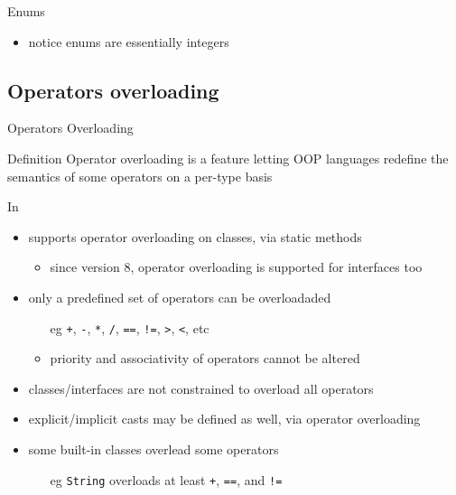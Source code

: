 \documentclass[presentation]{beamer}
\begin{document}
\begin{frame}[allowframebreaks]{Enums}
  \begin{itemize}
    \item notice enums are essentially integers
  \end{itemize}
\end{frame}

\subsection{Operators overloading}

\begin{frame}[allowframebreaks]{Operators Overloading}
  \begin{exampleblock}{Definition}\centering
    Operator overloading is a feature letting OOP languages redefine the semantics of some operators on a per-type basis
  \end{exampleblock}

  \begin{block}{In \dotnet}
    \begin{itemize}
      \item \dotnet supports operator overloading on classes, via static methods
      \begin{itemize}
        \item since version 8, operator overloading is supported for interfaces too
      \end{itemize}

      \item only a predefined set of operators can be overloadaded
      \begin{itemize}
        \item[eg] \texttt{+}, \texttt{-}, \texttt{*}, \texttt{/}, \texttt{==}, \texttt{!=}, \texttt{>}, \texttt{<}, etc
        \item priority and associativity of operators cannot be altered
      \end{itemize}

      \item classes/interfaces are not constrained to overload all operators
      
      \item explicit/implicit casts may be defined as well, via operator overloading
      
      \item some built-in classes overlead some operators
      \begin{itemize}
        \item[eg] \texttt{String} overloads at least \texttt{+}, \texttt{==}, and \texttt{!=}
      \end{itemize}
    \end{itemize}
  \end{block}


\end{frame}
\end{document}
